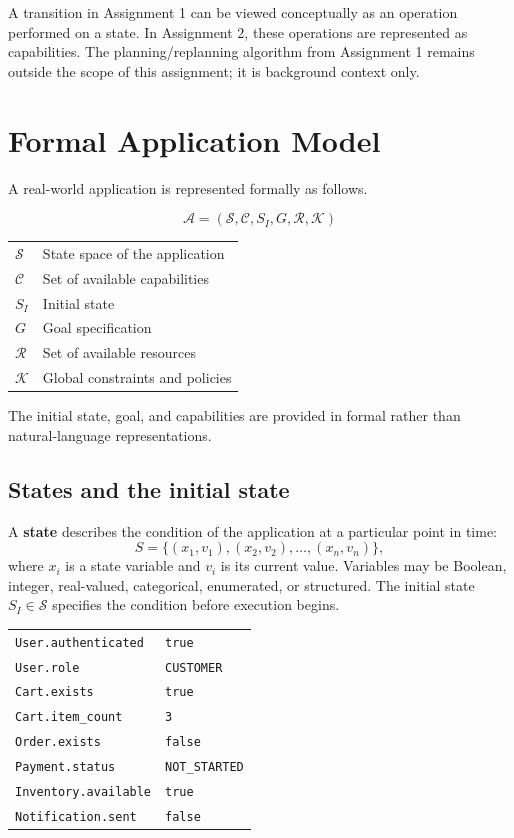\documentclass[11pt]{article}
\newcommand{\term}[1]{\textbf{\color{navy}#1}}
\newcommand{\code}[1]{\texttt{#1}}
\begin{document}
A transition in Assignment 1 can be viewed conceptually as an operation performed on a
state. In Assignment 2, these operations are represented as capabilities. The
planning/replanning algorithm from Assignment 1 remains outside the scope of this
assignment; it is background context only.

\section{Formal Application Model}

A real-world application is represented formally as follows.

\begin{keybox}[title={Formal application model}]
\[
  \mathcal{A}=(\mathcal{S},\mathcal{C},S_I,G,\mathcal{R},\mathcal{K})
\]
\begin{tabularx}{\textwidth}{@{}L{1.4cm}Y@{}}
\(\mathcal{S}\) & State space of the application \\[0.3em]
\(\mathcal{C}\) & Set of available capabilities \\[0.3em]
\(S_I\) & Initial state \\[0.3em]
\(G\) & Goal specification \\[0.3em]
\(\mathcal{R}\) & Set of available resources \\[0.3em]
\(\mathcal{K}\) & Global constraints and policies
\end{tabularx}
\end{keybox}

The initial state, goal, and capabilities are provided in formal rather than
natural-language representations.

\subsection{States and the initial state}

A \term{state} describes the condition of the application at a particular point in time:
\[
  S=\{(x_1,v_1),(x_2,v_2),\ldots,(x_n,v_n)\},
\]
where \(x_i\) is a state variable and \(v_i\) is its current value. Variables may be
Boolean, integer, real-valued, categorical, enumerated, or structured. The initial state
\(S_I\in\mathcal{S}\) specifies the condition before execution begins.

\begin{keybox}[title={Example initial state}]
\begin{tabularx}{\textwidth}{@{}lY@{}}
\code{User.authenticated} & \code{true} \\[0.3em]
\code{User.role} & \code{CUSTOMER} \\[0.3em]
\code{Cart.exists} & \code{true} \\[0.3em]
\code{Cart.item\_count} & \code{3} \\[0.3em]
\code{Order.exists} & \code{false} \\[0.3em]
\code{Payment.status} & \code{NOT\_STARTED} \\[0.3em]
\code{Inventory.available} & \code{true} \\[0.3em]
\code{Notification.sent} & \code{false}
\end{tabularx}
\end{keybox}
\end{document}

